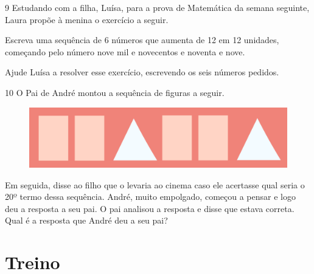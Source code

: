 \num{9} Estudando com a filha, Luísa, para a prova de Matemática da semana seguinte,
Laura propõe à menina o exercício a seguir.

Escreva uma sequência de 6 números que aumenta de 12 em 12 unidades,
começando pelo número nove mil e novecentos e noventa e nove.

Ajude Luísa a resolver esse exercício, escrevendo os seis números
pedidos.


\num{10} O Pai de André montou a sequência de figuras a seguir.

\begin{figure}[htpb!]
\centering
\includegraphics[width=.7\textwidth]{media/image19.png}
\end{figure}

Em seguida, disse ao filho que o levaria ao cinema caso ele acertasse
qual seria o 20º termo dessa sequência. André, muito empolgado, começou a
pensar e logo deu a resposta a seu pai. O pai analisou a resposta e
disse que estava correta. Qual é a resposta que André deu a seu pai?




\pagebreak
\section*{Treino}


